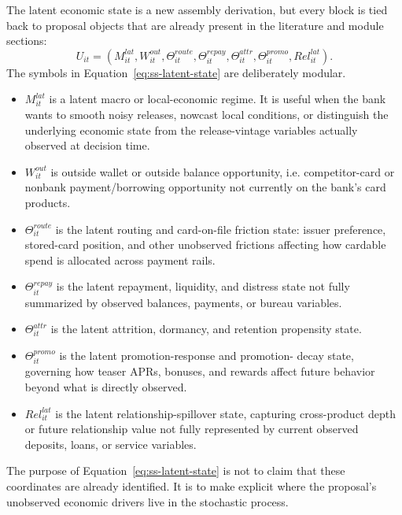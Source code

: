 \documentclass[11pt]{article}
\newcommand{\1}{\mathbf{1}}
\begin{document}
The latent economic state is a new assembly derivation, but every block is tied
back to proposal objects that are already present in the literature and module
sections:
\begin{equation}
  U_{it}
  =
  (M^{lat}_{it},W^{out}_{it},\Theta^{route}_{it},\Theta^{repay}_{it},
   \Theta^{attr}_{it},\Theta^{promo}_{it},Rel^{lat}_{it}).
  \label{eq:ss-latent-state}
\end{equation}
The symbols in Equation~\eqref{eq:ss-latent-state} are deliberately modular.
\begin{itemize}[leftmargin=*]
  \item $M^{lat}_{it}$ is a latent macro or local-economic regime. It is useful
        when the bank wants to smooth noisy releases, nowcast local conditions,
        or distinguish the underlying economic state from the release-vintage
        variables actually observed at decision time.
  \item $W^{out}_{it}$ is outside wallet or outside balance opportunity, i.e.
        competitor-card or nonbank payment/borrowing opportunity not currently
        on the bank's card products.
  \item $\Theta^{route}_{it}$ is the latent routing and card-on-file friction
        state: issuer preference, stored-card position, and other unobserved
        frictions affecting how cardable spend is allocated across payment rails.
  \item $\Theta^{repay}_{it}$ is the latent repayment, liquidity, and distress
        state not fully summarized by observed balances, payments, or bureau
        variables.
  \item $\Theta^{attr}_{it}$ is the latent attrition, dormancy, and retention
        propensity state.
  \item $\Theta^{promo}_{it}$ is the latent promotion-response and promotion-
        decay state, governing how teaser APRs, bonuses, and rewards affect
        future behavior beyond what is directly observed.
  \item $Rel^{lat}_{it}$ is the latent relationship-spillover state, capturing
        cross-product depth or future relationship value not fully represented by
        current observed deposits, loans, or service variables.
\end{itemize}
The purpose of Equation~\eqref{eq:ss-latent-state} is not to claim that these
coordinates are already identified. It is to make explicit where the proposal's
unobserved economic drivers live in the stochastic process.
\end{document}
